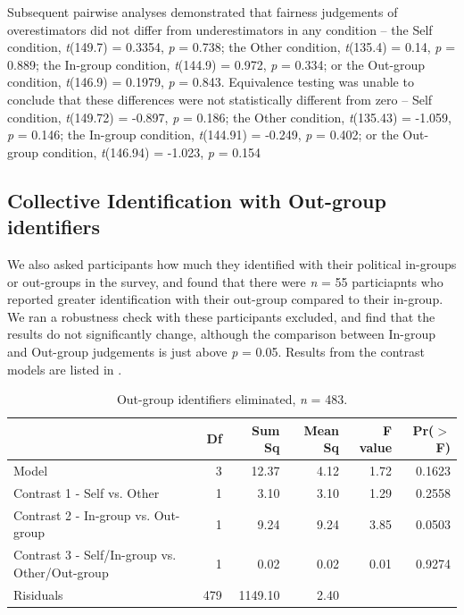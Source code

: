 \documentclass[12pt,]{article}
\begin{document}
Subsequent pairwise analyses demonstrated that fairness judgements of overestimators did not differ from underestimators in any condition -- the Self condition, \emph{t}(149.7) = 0.3354, \emph{p} = 0.738; the Other condition, \emph{t}(135.4) = 0.14, \emph{p} = 0.889; the In-group condition, \emph{t}(144.9) = 0.972, \emph{p} = 0.334; or the Out-group condition, \emph{t}(146.9) = 0.1979, \emph{p} = 0.843. Equivalence testing was unable to conclude that these differences were not statistically different from zero -- Self condition,  \emph{t}(149.72) = -0.897, \emph{p} = 0.186; the Other condition, \emph{t}(135.43) = -1.059, \emph{p} = 0.146; the In-group condition, \emph{t}(144.91) = -0.249, \emph{p} = 0.402; or the Out-group condition, \emph{t}(146.94) = -1.023, \emph{p} = 0.154



\clearpage
\subsection{Collective Identification with Out-group identifiers}
\label{appendix:CID1}


We also asked participants how much they identified with their political in-groups or out-groups in the survey, and found that there were \emph{n} = 55 particiapnts who reported greater identification with their out-group compared to their in-group. We ran a robustness check with these participants excluded, and find that the results do not significantly change, although the comparison between In-group and Out-group judgements is just above \emph{p} = 0.05. Results from the contrast models are listed in . 

\begin{table}[ht]
\centering
\begin{tabular}{lrrrrr}
  \hline
 & Df & Sum Sq & Mean Sq & F value & Pr($>$F) \\ 
  \hline
Model & 3 & 12.37 & 4.12 & 1.72 & 0.1623 \\ 
  Contrast 1 - Self vs. Other & 1 & 3.10 & 3.10 & 1.29 & 0.2558 \\ 
  Contrast 2 - In-group vs. Out-group & 1 & 9.24 & 9.24 & 3.85 & 0.0503 \\ 
  Contrast 3 - Self/In-group vs. Other/Out-group & 1 & 0.02 & 0.02 & 0.01 & 0.9274 \\ 
  Risiduals & 479 & 1149.10 & 2.40 &  &  \\ 
   \hline
\end{tabular}
\caption{Out-group identifiers eliminated, \emph{n} = 483. } 
\label{mismatch1}
\end{table}
\end{document}
